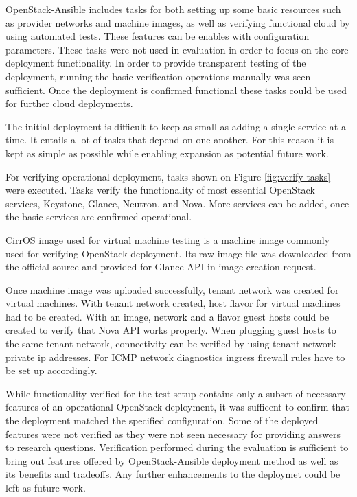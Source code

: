 OpenStack-Ansible includes tasks for both setting up some basic resources such
as provider networks and machine images, as well as verifying functional cloud
by using automated tests. These features can be enables with configuration
parameters. These tasks were not used in evaluation in order to focus on the
core deployment functionality. In order to provide transparent testing of the
deployment, running the basic verification operations manually was seen
sufficient. Once the deployment is confirmed functional these tasks could
be used for further cloud deployments.

The initial deployment is difficult to keep as small as adding a single service
at a time. It entails a lot of tasks that depend on one another. For this
reason it is kept as simple as possible while enabling expansion as potential
future work.

For verifying operational deployment, tasks shown on Figure
\ref{fig:verify-tasks} were executed. Tasks verify the functionality of most
essential OpenStack services, Keystone, Glance, Neutron, and Nova. More
services can be added, once the basic services are confirmed operational.

CirrOS image used for virtual machine testing is a machine image commonly used
for verifying OpenStack deployment. Its raw image file was downloaded from the
official source and provided for Glance API in image creation request.

Once machine image was uploaded successfully, tenant network was created for
virtual machines. With tenant network created, host flavor for virtual machines
had to be created. With an image, network and a flavor guest hosts could be
created to verify that Nova API works properly. When plugging guest hosts to
the same tenant network, connectivity can be verified by using tenant network
private ip addresses. For ICMP network diagnostics ingress firewall rules have
to be set up accordingly.

While functionality verified for the test setup contains only a subset of
necessary features of an operational OpenStack deployment, it was sufficent to
confirm that the deployment matched the specified configuration. Some of the
deployed features were not verified as they were not seen necessary for
providing answers to research questions. Verification performed during the
evaluation is sufficient to bring out features offered by OpenStack-Ansible
deployment method as well as its benefits and tradeoffs. Any further
enhancements to the deploymet could be left as future work.

